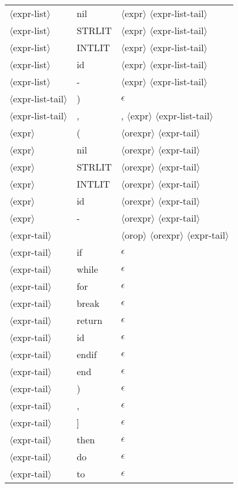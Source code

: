 \documentclass[11pt, fleqn]{article}
\newcommand{\atag}[1]{$\langle$#1$\rangle$}
\begin{document}
\begin{longtable}{l|l|l}
\atag{expr-list}					&	nil			&	\atag{expr} \atag{expr-list-tail}				\\
\atag{expr-list}					&	STRLIT		&	\atag{expr} \atag{expr-list-tail}				\\
\atag{expr-list}					&	INTLIT			&	\atag{expr} \atag{expr-list-tail}				\\
\atag{expr-list}					&	id			&	\atag{expr} \atag{expr-list-tail}				\\
\atag{expr-list}					&	-			&	\atag{expr} \atag{expr-list-tail}				\\
\atag{expr-list-tail}			&	)			&	$\epsilon$								\\
\atag{expr-list-tail}			&	,			&	, \atag{expr} \atag{expr-list-tail}		\\
\atag{expr}						&	(			&	\atag{orexpr} \atag{expr-tail}	\\
\atag{expr}						&	nil			&	\atag{orexpr} \atag{expr-tail}	\\
\atag{expr}						&	STRLIT			&	\atag{orexpr} \atag{expr-tail}	\\
\atag{expr}						&	INTLIT			&	\atag{orexpr} \atag{expr-tail}	\\
\atag{expr}						&	id			&	\atag{orexpr} \atag{expr-tail}	\\
\atag{expr}						&	-			&	\atag{orexpr} \atag{expr-tail}	\\
\atag{expr-tail}					&	\textbar		&	\atag{orop} \atag{orexpr} \atag{expr-tail}		\\
\atag{expr-tail}					&	if		&		$\epsilon$	\\
\atag{expr-tail}					&	while		&	$\epsilon$		\\
\atag{expr-tail}					&	for		&	$\epsilon$		\\
\atag{expr-tail}					&	break		&	$\epsilon$		\\
\atag{expr-tail}					&	return		&	$\epsilon$		\\
\atag{expr-tail}					&	id		&		$\epsilon$	\\
\atag{expr-tail}					&	endif		&	$\epsilon$		\\
\atag{expr-tail}					&	end		&	$\epsilon$		\\
\atag{expr-tail}					&	)		&	$\epsilon$		\\
\atag{expr-tail}					&	,		&	$\epsilon$		\\
\atag{expr-tail}					&	]		&	$\epsilon$		\\
\atag{expr-tail}					&	then		&	$\epsilon$		\\
\atag{expr-tail}					&	do		&	$\epsilon$		\\
\atag{expr-tail}					&	to		&	$\epsilon$		\\

\end{longtable}
\end{document}
